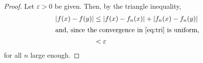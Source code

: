 \documentclass{article}
\begin{document}
\begin{proof}
Let $\varepsilon>0$ be given. Then, by the triangle inequality,
\begin{align}
|f(x)-f(y)| &\le |f(x)-f_n(x)| + |f_n(x)-f_n(y)| \label{eq:tri} \\
\intertext{and, since the convergence in \eqref{eq:tri} is uniform,}
 &< \varepsilon \notag
\end{align}
for all $n$ large enough.
\end{proof}
\end{document}

